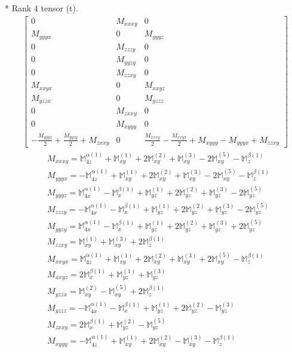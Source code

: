 \documentclass[fleqn,8pt,landscape]{jsarticle}
\begin{document}
* Rank 4 tensor (t).
\begin{align*}
\begin{bmatrix} 0 & M_{xxxy} & 0 \\ M_{yyyx} & 0 & M_{yyyz} \\ 0 & M_{zzzy} & 0 \\ 0 & M_{yyzy} & 0 \\ 0 & M_{zzxy} & 0 \\ M_{xxyx} & 0 & M_{xxyz} \\ M_{yzzx} & 0 & M_{yzzz} \\ 0 & M_{zxxy} & 0 \\ 0 & M_{xyyy} & 0 \\ - \frac{M_{yyyz}}{2} + \frac{M_{yyzy}}{2} + M_{zxxy} & 0 & \frac{M_{xxxy}}{2} - \frac{M_{xxyx}}{2} + M_{xyyy} - M_{yyyx} + M_{zzxy} \end{bmatrix}
\end{align*}
\begin{align*}
& M_{xxxy} = \mathbb{M}_{4z}^{\alpha(1)} + \mathbb{M}_{xy}^{(1)} + 2 \mathbb{M}_{xy}^{(2)} + \mathbb{M}_{xy}^{(3)} - 2 \mathbb{M}_{xy}^{(5)} - \mathbb{M}_{z}^{\beta(1)} \\
& M_{yyyx} = - \mathbb{M}_{4z}^{\alpha(1)} + \mathbb{M}_{xy}^{(1)} + 2 \mathbb{M}_{xy}^{(2)} + \mathbb{M}_{xy}^{(3)} - 2 \mathbb{M}_{xy}^{(5)} - \mathbb{M}_{z}^{\beta(1)} \\
& M_{yyyz} = \mathbb{M}_{4x}^{\alpha(1)} - \mathbb{M}_{x}^{\beta(1)} + \mathbb{M}_{yz}^{(1)} + 2 \mathbb{M}_{yz}^{(2)} + \mathbb{M}_{yz}^{(3)} - 2 \mathbb{M}_{yz}^{(5)} \\
& M_{zzzy} = - \mathbb{M}_{4x}^{\alpha(1)} - \mathbb{M}_{x}^{\beta(1)} + \mathbb{M}_{yz}^{(1)} + 2 \mathbb{M}_{yz}^{(2)} + \mathbb{M}_{yz}^{(3)} - 2 \mathbb{M}_{yz}^{(5)} \\
& M_{yyzy} = \mathbb{M}_{4x}^{\alpha(1)} - \mathbb{M}_{x}^{\beta(1)} + \mathbb{M}_{yz}^{(1)} + 2 \mathbb{M}_{yz}^{(2)} + \mathbb{M}_{yz}^{(3)} + 2 \mathbb{M}_{yz}^{(5)} \\
& M_{zzxy} = \mathbb{M}_{xy}^{(1)} + \mathbb{M}_{xy}^{(3)} + 2 \mathbb{M}_{z}^{\beta(1)} \\
& M_{xxyx} = \mathbb{M}_{4z}^{\alpha(1)} + \mathbb{M}_{xy}^{(1)} + 2 \mathbb{M}_{xy}^{(2)} + \mathbb{M}_{xy}^{(3)} + 2 \mathbb{M}_{xy}^{(5)} - \mathbb{M}_{z}^{\beta(1)} \\
& M_{xxyz} = 2 \mathbb{M}_{x}^{\beta(1)} + \mathbb{M}_{yz}^{(1)} + \mathbb{M}_{yz}^{(3)} \\
& M_{yzzx} = \mathbb{M}_{xy}^{(2)} - \mathbb{M}_{xy}^{(5)} + 2 \mathbb{M}_{z}^{\beta(1)} \\
& M_{yzzz} = - \mathbb{M}_{4x}^{\alpha(1)} - \mathbb{M}_{x}^{\beta(1)} + \mathbb{M}_{yz}^{(1)} + 2 \mathbb{M}_{yz}^{(2)} - \mathbb{M}_{yz}^{(3)} \\
& M_{zxxy} = 2 \mathbb{M}_{x}^{\beta(1)} + \mathbb{M}_{yz}^{(2)} - \mathbb{M}_{yz}^{(5)} \\
& M_{xyyy} = - \mathbb{M}_{4z}^{\alpha(1)} + \mathbb{M}_{xy}^{(1)} + 2 \mathbb{M}_{xy}^{(2)} - \mathbb{M}_{xy}^{(3)} - \mathbb{M}_{z}^{\beta(1)}
\end{align*}
\end{document}
